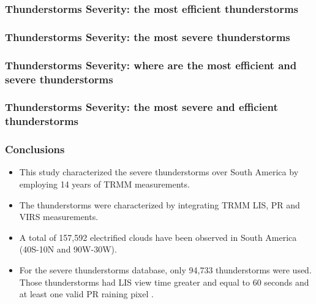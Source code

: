 \documentclass[smaller]{beamer}
\begin{document}
\begin{frame}
\frametitle{Thunderstorms Severity: the most efficient thunderstorms}

\end{frame}

\begin{frame}
\frametitle{Thunderstorms Severity: the most severe thunderstorms}

\end{frame}


\begin{frame}
\frametitle{Thunderstorms Severity: where are the most efficient and severe thunderstorms}

\end{frame}

\begin{frame}
\frametitle{Thunderstorms Severity: the most severe and efficient thunderstorms}

\end{frame}


\begin{frame}
\frametitle{Conclusions}

\begin{itemize}
\item This study characterized the severe thunderstorms over South America by employing 14 years of TRMM measurements. 
\item The thunderstorms were characterized by integrating TRMM LIS, PR and VIRS measurements.
\item A total of 157,592 electrified clouds have been observed in South America (40S-10N and 90W-30W). 
\item  For the severe thunderstorms database, only 94,733 thunderstorms were used. Those thunderstorms had LIS view time greater and equal to 60 seconds and at least one valid PR raining pixel . 


\end{itemize}
\end{frame}
\end{document}
